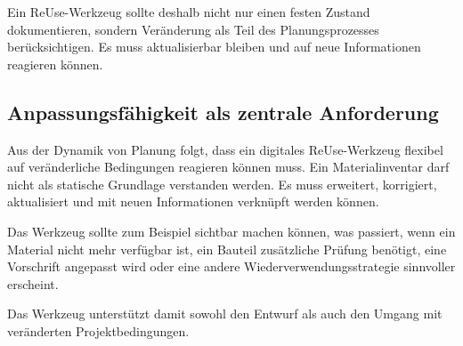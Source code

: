 Ein ReUse-Werkzeug sollte deshalb nicht nur einen festen Zustand dokumentieren, sondern Veränderung als Teil des Planungsprozesses berücksichtigen. Es muss aktualisierbar bleiben und auf neue Informationen reagieren können.

\subsection{Anpassungsfähigkeit als zentrale Anforderung}

Aus der Dynamik von Planung folgt, dass ein digitales ReUse-Werkzeug flexibel auf veränderliche Bedingungen reagieren können muss. Ein Materialinventar darf nicht als statische Grundlage verstanden werden. Es muss erweitert, korrigiert, aktualisiert und mit neuen Informationen verknüpft werden können.

Das Werkzeug sollte zum Beispiel sichtbar machen können, was passiert, wenn ein Material nicht mehr verfügbar ist, ein Bauteil zusätzliche Prüfung benötigt, eine Vorschrift angepasst wird oder eine andere Wiederverwendungsstrategie sinnvoller erscheint.

Das Werkzeug unterstützt damit sowohl den Entwurf als auch den Umgang mit veränderten Projektbedingungen.
